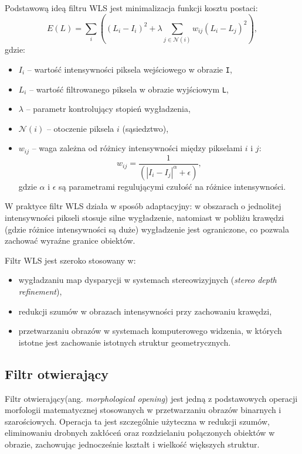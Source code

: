 \documentclass[magisterska]{pracadypl}
\begin{document}
Podstawową ideą filtru WLS jest minimalizacja funkcji kosztu postaci:
\[
E(L) = \sum_i \left( (L_i - I_i)^2 + \lambda \sum_{j \in \mathcal{N}(i)} w_{ij} (L_i - L_j)^2 \right),
\]
gdzie:
\begin{itemize}
    \item \(I_i\) – wartość intensywności piksela wejściowego w obrazie \texttt{I},
    \item \(L_i\) – wartość filtrowanego piksela w obrazie wyjściowym \texttt{L},
    \item \(\lambda\) – parametr kontrolujący stopień wygładzenia,
    \item \(\mathcal{N}(i)\) – otoczenie piksela \(i\) (sąsiedztwo),
    \item \(w_{ij}\) – waga zależna od różnicy intensywności między pikselami \(i\) i \(j\):
    \[
    w_{ij} = \frac{1}{(|I_i - I_j|^\alpha + \epsilon)},
    \]
    gdzie \(\alpha\) i \(\epsilon\) są parametrami regulującymi czułość na różnice intensywności.
\end{itemize}

W praktyce filtr WLS działa w sposób adaptacyjny: w obszarach o jednolitej intensywności pikseli stosuje silne wygładzenie, natomiast w pobliżu krawędzi (gdzie różnice intensywności są duże) wygładzenie jest ograniczone, co pozwala zachować wyraźne granice obiektów.

Filtr WLS jest szeroko stosowany w:
\begin{itemize}
    \item wygładzaniu map dysparycji w systemach stereowizyjnych (\textit{stereo depth refinement}),
    \item redukcji szumów w obrazach intensywności przy zachowaniu krawędzi,
    \item przetwarzaniu obrazów w systemach komputerowego widzenia, w których istotne jest zachowanie istotnych struktur geometrycznych.
\end{itemize}

\subsection{Filtr otwierający}

Filtr otwierający(ang. \textit{morphological opening}) \cite{open} jest jedną z podstawowych operacji morfologii matematycznej stosowanych w przetwarzaniu obrazów binarnych i szarościowych. Operacja ta jest szczególnie użyteczna w redukcji szumów, eliminowaniu drobnych zakłóceń oraz rozdzielaniu połączonych obiektów w obrazie, zachowując jednocześnie kształt i wielkość większych struktur.
\end{document}

